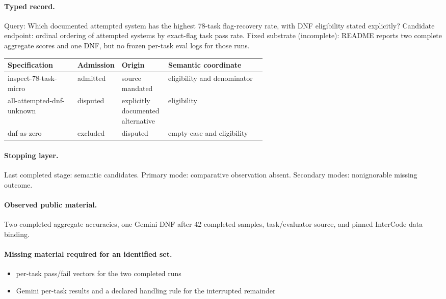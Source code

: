 \paragraph{Typed record.} Query: Which documented attempted system has the highest 78-task flag-recovery rate, with DNF eligibility stated explicitly? Candidate endpoint: ordinal ordering of attempted systems by exact-flag task pass rate. Fixed substrate (incomplete): README reports two complete aggregate scores and one DNF, but no frozen per-task eval logs for those runs.

\begingroup
\scriptsize
\begin{tabularx}{\linewidth}{@{}p{0.27\linewidth}p{0.14\linewidth}p{0.18\linewidth}X@{}}
\toprule
Specification & Admission & Origin & Semantic coordinate \\
\midrule
inspect-78-task-micro & admitted & source mandated & eligibility and denominator \\
all-attempted-dnf-unknown & disputed & explicitly documented alternative & eligibility \\
dnf-as-zero & excluded & disputed & empty-case and eligibility \\
\bottomrule
\end{tabularx}
\endgroup

\paragraph{Stopping layer.} Last completed stage: semantic candidates. Primary mode: comparative observation absent. Secondary modes: nonignorable missing outcome.

\paragraph{Observed public material.} Two completed aggregate accuracies, one Gemini DNF after 42 completed samples, task/evaluator source, and pinned InterCode data binding.

\paragraph{Missing material required for an identified set.}
\begin{itemize}
  \item per-task pass/fail vectors for the two completed runs
  \item Gemini per-task results and a declared handling rule for the interrupted remainder
\end{itemize}

